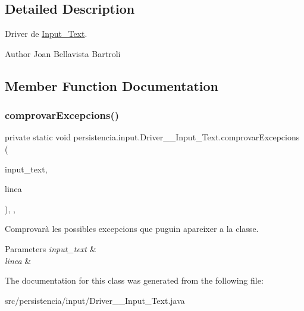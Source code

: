 \subsection{Detailed Description}
Driver de \hyperlink{classpersistencia_1_1input_1_1Input__Text}{Input\+\_\+\+Text}. 

\begin{DoxyAuthor}{Author}
Joan Bellavista Bartroli 
\end{DoxyAuthor}


\subsection{Member Function Documentation}
\mbox{\label{classpersistencia_1_1input_1_1Driver____Input__Text_a8d9bcf9b177d3d13d0d4541eab4916ad}} 
\subsubsection{\texorpdfstring{comprovar\+Excepcions()}{comprovarExcepcions()}}
{\footnotesize\ttfamily private static void persistencia.\+input.\+Driver\+\_\+\+\_\+\+Input\+\_\+\+Text.\+comprovar\+Excepcions (\begin{DoxyParamCaption}\item[{\hyperlink{classpersistencia_1_1input_1_1Input__Text}{Input\+\_\+\+Text}}]{input\+\_\+text,  }\item[{String}]{linea }\end{DoxyParamCaption})\hspace{0.3cm}{\ttfamily [inline]}, {\ttfamily [static]}, {\ttfamily [private]}}



Comprovarà les possibles excepcions que puguin apareixer a la classe. 


\begin{DoxyParams}{Parameters}
{\em input\+\_\+text} & \\
\hline
{\em linea} & \\
\hline
\end{DoxyParams}


The documentation for this class was generated from the following file\+:\begin{DoxyCompactItemize}
\item 
src/persistencia/input/Driver\+\_\+\+\_\+\+Input\+\_\+\+Text.\+java\end{DoxyCompactItemize}
